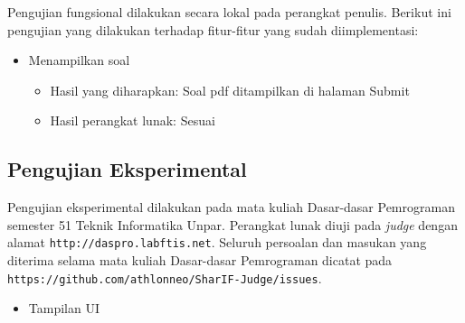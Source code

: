 Pengujian fungsional dilakukan secara lokal pada perangkat penulis. Berikut ini pengujian yang dilakukan terhadap fitur-fitur yang sudah diimplementasi:

\begin{itemize}
    \item Menampilkan soal
    \begin{itemize}
        \item Hasil yang diharapkan: Soal pdf ditampilkan di halaman Submit
        \item Hasil perangkat lunak: Sesuai
    \end{itemize}
\end{itemize}

\subsection{Pengujian Eksperimental}
\label{subsec:5:eksperimental}

Pengujian eksperimental dilakukan pada mata kuliah Dasar-dasar Pemrograman semester 51 Teknik Informatika Unpar. Perangkat lunak diuji pada \textit{judge} dengan alamat \verb|http://daspro.labftis.net|. Seluruh persoalan dan masukan yang diterima selama mata kuliah Dasar-dasar Pemrograman dicatat pada \verb|https://github.com/athlonneo/SharIF-Judge/issues|.

\begin{itemize}
    \item Tampilan UI
\end{itemize}


